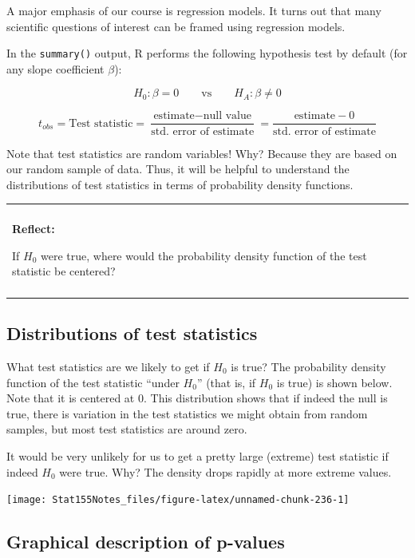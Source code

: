 \documentclass[]{book}
\newenvironment{reflect}
{
    \begin{center}
    
    \begin{tabular}{|p{0.8\textwidth}|}
    \rowcolor{LightBlue}
    \hline\\
    \rowcolor{LightBlue}
    \textbf{Reflect:}
}
{
    \\\rowcolor{LightBlue}
    \\\hline
    \end{tabular} 
    \end{center}
}
\begin{document}
A major emphasis of our course is regression models. It turns out that many scientific questions of interest can be framed using regression models.

In the \texttt{summary()} output, R performs the following hypothesis test by default (for any slope coefficient \(\beta\)):

\[H_0: \beta = 0 \qquad \text{vs} \qquad H_A: \beta \neq 0\]

\[t_{obs} = \text{Test statistic} = \frac{\text{estimate} - \text{null value}}{\text{std. error of estimate}} = \frac{\text{estimate} - 0}{\text{std. error of estimate}} \]

Note that test statistics are random variables! Why? Because they are based on our random sample of data. Thus, it will be helpful to understand the distributions of test statistics in terms of probability density functions.

\begin{reflect}
If \(H_0\) were true, where would the probability density function of
the test statistic be centered?
\end{reflect}

\hypertarget{distributions-of-test-statistics}{%
\subsection{Distributions of test statistics}\label{distributions-of-test-statistics}}

What test statistics are we likely to get if \(H_0\) is true? The probability density function of the test statistic ``under \(H_0\)'' (that is, if \(H_0\) is true) is shown below. Note that it is centered at 0. This distribution shows that if indeed the null is true, there is variation in the test statistics we might obtain from random samples, but most test statistics are around zero.

It would be very unlikely for us to get a pretty large (extreme) test statistic if indeed \(H_0\) were true. Why? The density drops rapidly at more extreme values.

\begin{center}\texttt{[image: Stat155Notes\_files/figure-latex/unnamed-chunk-236-1]} \end{center}

\hypertarget{graphical-description-of-p-values}{%
\subsection{Graphical description of p-values}\label{graphical-description-of-p-values}}
\end{document}

